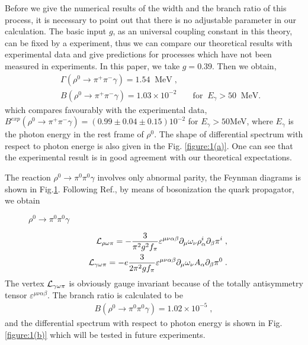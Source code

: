 Before we give the numerical results of the width and the branch ratio of
this process, it is necessary to point out that there is 
no adjustable parameter in our calculation. The basic input $g$, as an
universal coupling constant in this theory, can be fixed by a experiment, 
thus we can compare our theoretical results with experimental data and 
give predictions for processes which have not
been measured in experiments.
In this paper, we take $g=0.39$. Then we obtain,
\begin{eqnarray*}
& &\Gamma(\rho^0 \rightarrow \pi^+\pi^-\gamma)=1.54\;\; \mbox{MeV}{\;}, \\
& &B(\rho^0 \rightarrow \pi^+\pi^-\gamma)=1.03\times10^{-2}
\;\;\;\;\;\;\;\mbox{for}\;\;E_\gamma >50\;\;\mbox{MeV}.
\end{eqnarray*}  
which compares favourably with the experimental data{\cite {Do}}, $B^{exp} 
(\rho^0 \rightarrow \pi^+\pi^-\gamma)=(0.99\pm 0.04\pm 0.15) 10^{-2}$
for $E_\gamma >50$MeV, where $E_\gamma$ is the photon energy in the rest
frame of $\rho^0$. The shape of differential spectrum with respect to
photon energe is also given in the Fig. \ref{figure:1(a)}. One can see
that the experimental result is in good agreement with our theoretical
expectations.



The reaction $\rho^0 \rightarrow \pi^0\pi^0\gamma$
involves only abnormal parity, the Feynman diagrams is shown in 
Fig.\ref{figure:0(b)}. Following Ref.{\cite {Li1}}, by means of
bosonization the quark propagator, we obtain               
\begin{figure}[h]
   \centering
   \caption{$\rho^0 \rightarrow \pi^0 \pi^0\gamma$}                     
   \label{figure:0(b)}
\end{figure}
\begin{eqnarray}
& &{\cal L}_{\rho\omega\pi}=-\frac{3}{\pi^2 g^2 f_\pi}\varepsilon^
{\mu\nu\alpha\beta}\partial_\mu\omega_\nu\rho_\alpha^i\partial_\beta
\pi^i {\;},\\
& &{\cal L}_{\gamma\omega\pi}=-e \frac{3}{2 \pi^2 g f_\pi}\varepsilon^
{\mu\nu\alpha\beta}\partial_\mu\omega_\nu A_\alpha\partial_\beta\pi^0{\;}.
\end{eqnarray}
The vertex ${\cal L}_{\gamma\omega\pi}$ is obviously gauge invariant
because of the totally antisymmetry tensor
$\varepsilon^{\mu\nu\alpha\beta}$. The branch ratio is calculated to
be 
\begin{eqnarray}
B(\rho^0 \rightarrow \pi^0\pi^0\gamma)=1.02\times 10^{-5} {\;},
\end{eqnarray}
and the differential spectrum with respect to photon energy is shown 
in Fig.\ref{figure:1(b)} which will be tested in future experiments.


